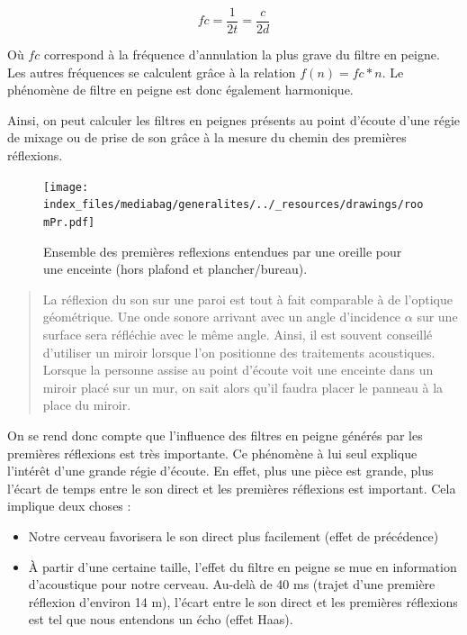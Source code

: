 \documentclass[
  letterpaper,
  DIV=11,
  numbers=noendperiod]{scrreprt}
\providecommand{\tightlist}{%
  \setlength{\itemsep}{0pt}\setlength{\parskip}{0pt}}\usepackage{longtable,booktabs,array}
\begin{document}
\[ fc = \frac 1{2t} = \frac c{2d} \]

Où \(fc\) correspond à la fréquence d'annulation la plus grave du filtre
en peigne. Les autres fréquences se calculent grâce à la relation
\(f(n) = fc*n\). Le phénomène de filtre en peigne est donc également
harmonique.

Ainsi, on peut calculer les filtres en peignes présents au point
d'écoute d'une régie de mixage ou de prise de son grâce à la mesure du
chemin des premières réflexions.

\begin{figure}

{\centering \texttt{[image: index\_files/mediabag/generalites/../\_resources/drawings/roomPr.pdf]}

}

\caption{\label{fig-pr}Ensemble des premières reflexions entendues par
une oreille pour une enceinte (hors plafond et plancher/bureau).}

\end{figure}

\begin{quote}
La réflexion du son sur une paroi est tout à fait comparable à de
l'optique géométrique. Une onde sonore arrivant avec un angle
d'incidence \(\alpha\) sur une surface sera réfléchie avec le même
angle. Ainsi, il est souvent conseillé d'utiliser un miroir lorsque l'on
positionne des traitements acoustiques. Lorsque la personne assise au
point d'écoute voit une enceinte dans un miroir placé sur un mur, on
sait alors qu'il faudra placer le panneau à la place du miroir.
\end{quote}

On se rend donc compte que l'influence des filtres en peigne générés par
les premières réflexions est très importante. Ce phénomène à lui seul
explique l'intérêt d'une grande régie d'écoute. En effet, plus une pièce
est grande, plus l'écart de temps entre le son direct et les premières
réflexions est important. Cela implique deux choses :

\begin{itemize}
\tightlist
\item
  Notre cerveau favorisera le son direct plus facilement (effet de
  précédence)
\item
  À partir d'une certaine taille, l'effet du filtre en peigne se mue en
  information d'acoustique pour notre cerveau. Au-delà de 40 ms (trajet
  d'une première réflexion d'environ 14 m), l'écart entre le son direct
  et les premières réflexions est tel que nous entendons un écho (effet
  Haas).
\end{itemize}
\end{document}
